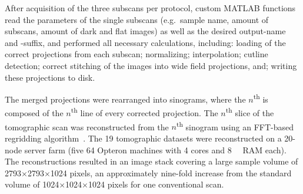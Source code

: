 After acquisition of the three subscans per protocol, custom MATLAB functions read the parameters of the single subscans (e.g.\ sample name, amount of subscans, amount of dark and flat images) as well as the desired output-name and -suffix, and performed all necessary calculations, including: loading of the correct projections from each subscan; normalizing; interpolation; cutline detection; correct stitching of the images into wide field projections, and; writing these projections to disk.

The merged projections were rearranged into sinograms, where the $n$\textsuperscript{th} is composed of the $n$\textsuperscript{th} line of every corrected projection. The $n$\textsuperscript{th} slice of the tomographic scan was reconstructed from the $n$\textsuperscript{th} sinogram using an FFT-based regridding algorithm~\cite{Dowd1999}. The 19 tomographic datasets were reconstructed on a 20-node server farm (five \SI{64}{\bit} Opteron machines with 4 cores and \SI{8}{\giga\byte} RAM each). The reconstructions resulted in an image stack covering a large sample volume of 2793$\times$2793$\times$1024 pixels, an approximately nine-fold increase from the standard volume of 1024$\times$1024$\times$1024 pixels for one conventional scan.